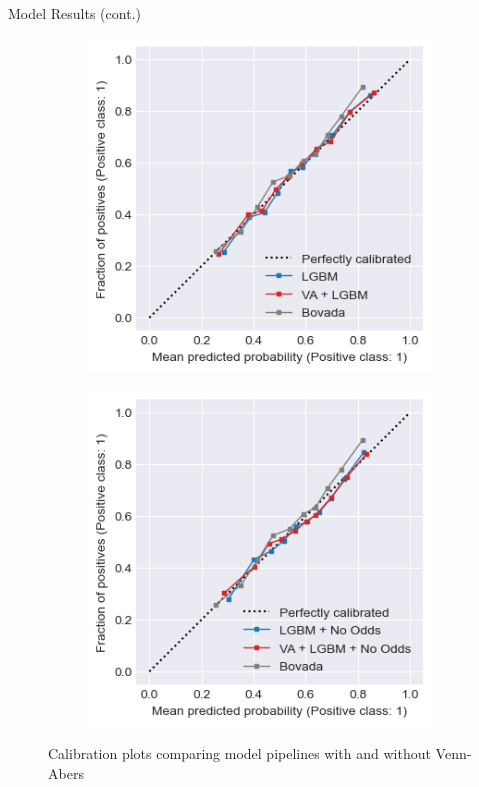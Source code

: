 \documentclass[aspectratio=169,xcolor=dvipsnames]{beamer}
\begin{document}
\begin{frame}{Model Results (cont.)}
\begin{figure}
\begin{subfigure}{.24\linewidth}
        \end{subfigure}
        \begin{subfigure}{.24\linewidth}
            \centering
            \includegraphics[width=\linewidth]{figures/lightgbm_and_va.png}
        \end{subfigure}
        \begin{subfigure}{.24\linewidth}
            \centering
            \includegraphics[width=\linewidth]{figures/lightgbm_no_odds_and_va.png}
        \end{subfigure}
        \caption{Calibration plots comparing model pipelines with and without Venn-Abers}
    \end{figure}
\end{frame}
\end{document}
